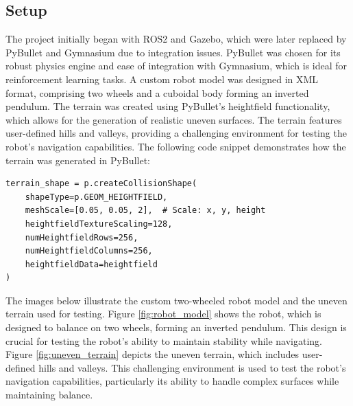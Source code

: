 \documentclass[12pt, draftclsnofoot, onecolumn]{IEEEtran}
\begin{document}
\subsection{Setup}
The project initially began with ROS2 and Gazebo, which were later replaced by PyBullet and Gymnasium due to integration issues. PyBullet was chosen for its robust physics engine and ease of integration with Gymnasium, which is ideal for reinforcement learning tasks. A custom robot model was designed in XML format, comprising two wheels and a cuboidal body forming an inverted pendulum. The terrain was created using PyBullet's heightfield functionality, which allows for the generation of realistic uneven surfaces. The terrain features user-defined hills and valleys, providing a challenging environment for testing the robot's navigation capabilities. The following code snippet demonstrates how the terrain was generated in PyBullet:

\begin{verbatim}
terrain_shape = p.createCollisionShape(
    shapeType=p.GEOM_HEIGHTFIELD,
    meshScale=[0.05, 0.05, 2],  # Scale: x, y, height
    heightfieldTextureScaling=128,
    numHeightfieldRows=256,
    numHeightfieldColumns=256,
    heightfieldData=heightfield
)
\end{verbatim}

The images below illustrate the custom two-wheeled robot model and the uneven terrain used for testing. Figure \ref{fig:robot_model} shows the robot, which is designed to balance on two wheels, forming an inverted pendulum. This design is crucial for testing the robot's ability to maintain stability while navigating. Figure \ref{fig:uneven_terrain} depicts the uneven terrain, which includes user-defined hills and valleys. This challenging environment is used to test the robot's navigation capabilities, particularly its ability to handle complex surfaces while maintaining balance.
\end{document}
